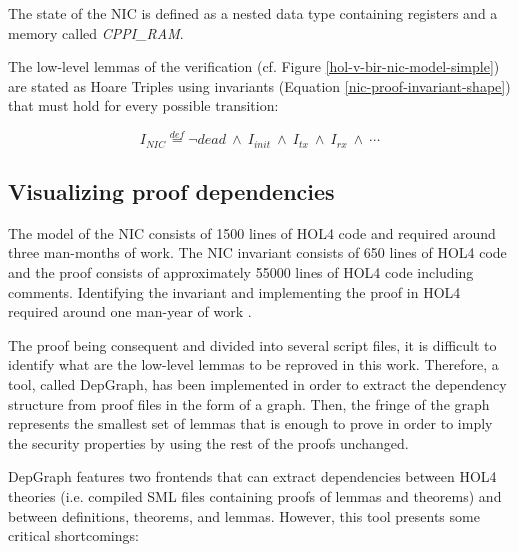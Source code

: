 \documentclass[10pt,a4paper]{article}
\newcommand{\eqdef}{\stackrel{def}{=}}
\begin{document}
\begin{multicols}{2}

The state of the NIC is defined as a nested data type containing registers and a memory called \textit{CPPI\_RAM}.

The low-level lemmas of the verification (cf. Figure \ref{hol-v-bir-nic-model-simple}) are stated as Hoare Triples using invariants (Equation \ref{nic-proof-invariant-shape}) that must hold for every possible transition:
\begin{small}
  \begin{equation}
    \label{nic-proof-invariant-shape}
    I_{NIC} \eqdef \neg dead~\land~I_{init}~\land~I_{tx}~\land~I_{rx}~\land~\cdots
  \end{equation}
\end{small}

\subsection{Visualizing proof dependencies}

The model of the NIC consists of \num{1500} lines of HOL4 code and required around three man-months of work. The NIC invariant consists of \num{650} lines of HOL4 code and the proof consists of approximately \num{55000} lines of HOL4 code including comments. Identifying the invariant and implementing the proof in HOL4 required around one man-year of work \cite{haglund_trustworthy_nodate}.

The proof being consequent and divided into several script files, it is difficult to identify what are the low-level lemmas to be reproved in this work. Therefore, a tool, called DepGraph, has been implemented in order to extract the dependency structure from proof files in the form of a graph. Then, the fringe of the graph represents the smallest set of lemmas that is enough to prove in order to imply the security properties by using the rest of the proofs unchanged.

DepGraph features two frontends that can extract dependencies between HOL4 theories (i.e. compiled {SML} files containing proofs of lemmas and theorems) and between definitions, theorems, and lemmas. However, this tool presents some critical shortcomings:


\end{multicols}
\end{document}
